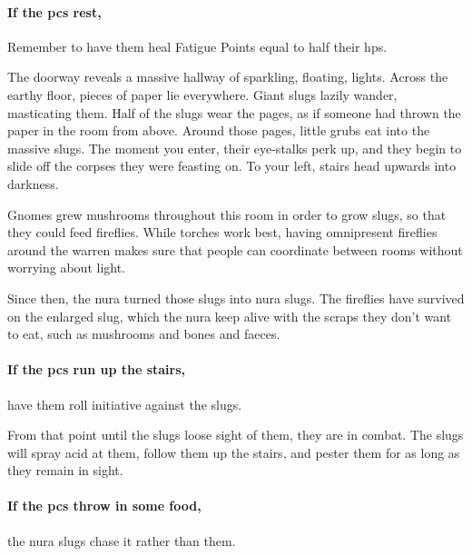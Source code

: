 \begin{multicols}{2}
{  \paragraph{If the \glspl{pc} rest,}
  Remember to have them heal Fatigue Points equal to half their \glspl{hp}.
}{}


\begin{boxtext}

  The doorway reveals a massive hallway of sparkling, floating, lights.
  Across the earthy floor, pieces of paper lie everywhere.
  Giant slugs lazily wander, masticating them.
  Half of the slugs wear the pages, as if someone had thrown the paper in the room from above.
  Around those pages, little grubs eat into the massive slugs.
  The moment you enter, their eye-stalks perk up, and they begin to slide off the corpses they were feasting on.
  To your left, stairs head upwards into darkness.

\end{boxtext}

\begin{exampletext}

Gnomes grew mushrooms throughout this room in order to grow slugs, so that they could feed fireflies.
While torches work best, having omnipresent fireflies around the warren makes sure that people can coordinate between rooms without worrying about light.

Since then, the nura turned those slugs into nura slugs.
The fireflies have survived on the enlarged slug, which the nura keep alive with the scraps they don't want to eat, such as mushrooms and bones and faeces.

\end{exampletext}

\paragraph{If the \glspl{pc} run up the stairs,}
have them roll initiative against the slugs.

From that point until the slugs loose sight of them, they are in combat.
The slugs will spray acid at them, follow them up the stairs, and pester them for as long as they remain in sight.

\paragraph{If the \glspl{pc} throw in some food,}
the nura slugs chase it rather than them.


\end{multicols}
